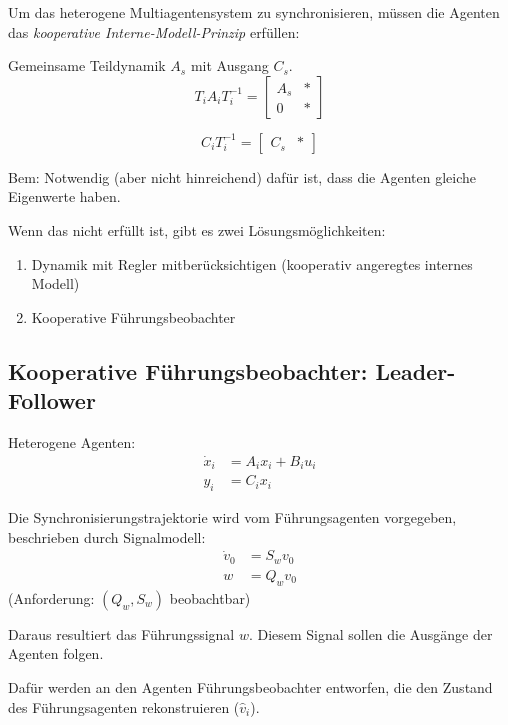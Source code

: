 Um das heterogene Multiagentensystem zu synchronisieren, müssen die Agenten das \emph{kooperative Interne-Modell-Prinzip} erfüllen:

Gemeinsame Teildynamik $A_s$ mit Ausgang $C_s$.
\begin{equation}
    T_i A_i T_i^{-1} = \begin{bmatrix}
        A_s & * \\
        0 & *
    \end{bmatrix}
\end{equation}

\begin{equation}
    C_i T_i^{-1} = \begin{bmatrix}
        C_s & *
    \end{bmatrix}
\end{equation}

Bem: Notwendig (aber nicht hinreichend) dafür ist, dass die Agenten gleiche Eigenwerte haben.

Wenn das nicht erfüllt ist, gibt es zwei Lösungsmöglichkeiten:
\begin{enumerate}
    \item Dynamik mit Regler mitberücksichtigen (kooperativ angeregtes internes Modell)
    \item Kooperative Führungsbeobachter
\end{enumerate}


\subsection{Kooperative Führungsbeobachter: Leader-Follower}
\label{sec:koop_beob}

Heterogene Agenten:
\begin{align}
    \dot{x}_i &= A_i x_i + B_i u_i \\
    y_i &= C_i x_i
\end{align}

Die Synchronisierungstrajektorie wird vom Führungsagenten vorgegeben, beschrieben
durch Signalmodell:
\begin{align}
    \dot{v}_0 &= S_w v_0 \\
    w &= Q_w v_0
\end{align}
(Anforderung: $(Q_w, S_w)$ beobachtbar)

Daraus resultiert das Führungssignal $w$.
Diesem Signal sollen die Ausgänge der Agenten folgen.

Dafür werden an den Agenten Führungsbeobachter entworfen, die den Zustand des
Führungsagenten rekonstruieren ($\hat{v}_i$).

